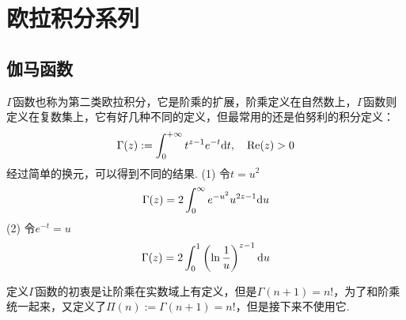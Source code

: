\documentclass[main.tex]{subfiles}
\begin{document}
\section{欧拉积分系列}

\subsection{伽马函数}

\(\Gamma\)函数也称为第二类欧拉积分，它是阶乘的扩展，阶乘定义在自然数上，\(\Gamma\)函数则定义在复数集上，它有好几种不同的定义，但最常用的还是伯努利的积分定义：
\[ \Gamma(z) := \int_0^{+\infty} t^{z-1} e^{-t} {\rm d}t, \quad {\rm Re}(z) > 0 \]
经过简单的换元，可以得到不同的结果.
\newline
(1) 令\(t=u^2\)
\[ \Gamma(z) = 2\int_{0}^{\infty}e^{-u^2}u^{2z-1}{\rm d}u\]
(2) 令\(e^{-t}=u\)
\[ \Gamma(z) = 2\int_{0}^{1}\left(\ln\frac{1}{u}\right)^{z-1}{\rm d}u\]

定义\(\Gamma\)函数的初衷是让阶乘在实数域上有定义，但是\(\Gamma(n+1)=n!\)，为了和阶乘统一起来，又定义了\(\Pi(n):=\Gamma(n+1)=n!\)，但是接下来不使用它.
\end{document}
